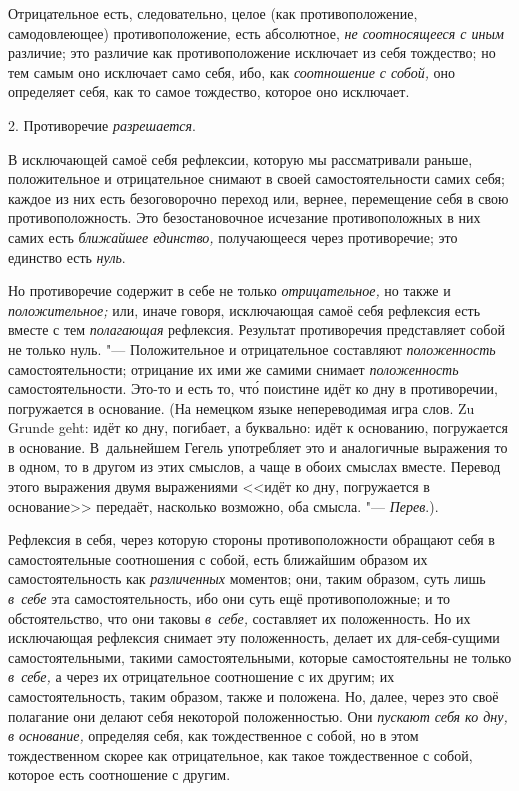 Отрицательное есть, следовательно, целое (как противоположение,
самодовлеющее) противоположение, есть абсолютное,
{\em не соотносящееся с иным} различие; это различие
как противоположение исключает из себя тождество; но тем самым оно
исключает само себя, ибо, как {\em соотношение с
собой,} оно определяет себя, как то самое тождество, которое оно исключает.


\bigskip

2. Противоречие {\em разрешается}.

В исключающей самоё себя рефлексии, которую мы рассматривали раньше,
положительное и отрицательное снимают в своей самостоятельности самих себя;
каждое из них есть безоговорочно переход или, вернее, перемещение себя в
свою противоположность. Это безостановочное исчезание противоположных в них
самих есть {\em ближайшее единство,} получающееся через
противоречие; это единство есть {\em нуль}.

Но противоречие содержит в себе не только {\em отрицательное,} но также и
{\em положительное;} или, иначе говоря, исключающая
самоё себя рефлексия есть вместе с тем {\em полагающая}
рефлексия. Результат противоречия представляет собой не только нуль. "---
Положительное и отрицательное составляют
{\em положенность} самостоятельности; отрицание их ими
же самими снимает {\em положенность} самостоятельности.
Это-то и есть то, чт\'{о} поистине идёт ко дну в противоречии, погружается в
основание. (На немецком языке непереводимая игра слов. Zu Grunde geht: идёт
ко дну, погибает, а буквально: идёт к основанию, погружается в основание.
В~дальнейшем Гегель употребляет это и аналогичные выражения то в одном, то в
другом из этих смыслов, а чаще в обоих смыслах вместе. Перевод этого
выражения двумя выражениями <<идёт ко дну, погружается в основание>>
передаёт, насколько возможно, оба смысла. "---
{\em Перев}.).

Рефлексия в себя, через которую стороны противоположности обращают себя в
самостоятельные соотношения с собой, есть ближайшим образом их
самостоятельность как {\em различенных} моментов; они,
таким образом, суть лишь {\em в~себе} эта
самостоятельность, ибо они суть ещё противоположные; и то обстоятельство,
что они таковы {\em в~себе,} составляет их
положенность. Но их исключающая рефлексия снимает эту положенность, делает
их для-себя-сущими самостоятельными, такими самостоятельными, которые
самостоятельны не только {\em в~себе,} а через их
отрицательное соотношение с их другим; их самостоятельность, таким образом,
также и положена. Но, далее, через это своё полагание они делают себя
некоторой положенностью. Они {\em пускают себя ко дну,
в основание,} определяя себя, как тождественное с собой, но в этом
тождественном скорее как отрицательное, как такое тождественное с собой,
которое есть соотношение с другим.


